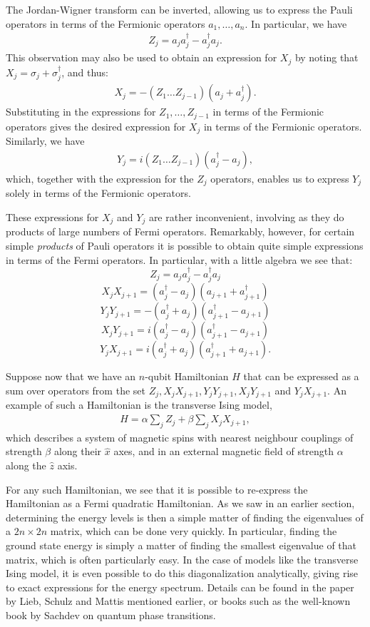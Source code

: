 \documentclass[12pt]{article}
\begin{document}
The Jordan-Wigner transform can be inverted, allowing us to express
the Pauli operators in terms of the Fermionic operators
$a_1,\ldots,a_n$.  In particular, we have
\begin{eqnarray}
  Z_j = a_ja_j^\dagger-a_j^\dagger a_j.
\end{eqnarray}
This observation may also be used to obtain an expression for $X_j$ by
noting that $X_j = \sigma_j +\sigma_j^\dagger$, and thus:
\begin{eqnarray}
  X_j = -(Z_1 \ldots Z_{j-1}) (a_j+a_j^\dagger).
\end{eqnarray}
Substituting in the expressions for $Z_1,\ldots,Z_{j-1}$ in terms of
the Fermionic operators gives the desired expression for $X_j$ in
terms of the Fermionic operators.  Similarly, we have
\begin{eqnarray}
  Y_j = i (Z_1 \ldots Z_{j-1}) (a_{j}^\dagger-a_{j}),
\end{eqnarray}
which, together with the expression for the $Z_j$ operators, enables
us to express $Y_j$ solely in terms of the Fermionic operators.

These expressions for $X_j$ and $Y_j$ are rather inconvenient,
involving as they do products of large numbers of Fermi operators.
Remarkably, however, for certain simple \emph{products} of Pauli
operators it is possible to obtain quite simple expressions in terms
of the Fermi operators.  In particular, with a little algebra we see
that:
$$
  Z_j = a_ja_j^\dagger - a_j^\dagger a_j
$$
$$
  X_jX_{j+1} = (a_j^\dagger-a_j)(a_{j+1}+a_{j+1}^\dagger )
$$
$$
  Y_jY_{j+1} = -(a_j^\dagger+a_j)(a_{j+1}^\dagger-a_{j+1})
$$
$$
  X_jY_{j+1} =  i(a_j^\dagger-a_j) (a_{j+1}^\dagger-a_{j+1})
$$
$$
  Y_jX_{j+1} = i(a_j^\dagger+a_j) (a_{j+1}^\dagger+a_{j+1}).
$$

Suppose now that we have an $n$-qubit Hamiltonian $H$ that can be
expressed as a sum over operators from the set $Z_j,
X_jX_{j+1},Y_jY_{j+1},X_jY_{j+1}$ and $Y_{j}X_{j+1}$.  An example of
such a Hamiltonian is the transverse Ising model,
\begin{eqnarray}
  H = \alpha \sum_j Z_j + \beta \sum_j X_j X_{j+1},
\end{eqnarray}
which describes a system of magnetic spins with nearest neighbour
couplings of strength $\beta$ along their $\hat x$ axes, and in an
external magnetic field of strength $\alpha$ along the $\hat z$ axis.

For any such Hamiltonian, we see that it is possible to re-express the
Hamiltonian as a Fermi quadratic Hamiltonian.  As we saw in an earlier
section, determining the energy levels is then a simple matter of
finding the eigenvalues of a $2n \times 2n$ matrix, which can be done
very quickly. In particular, finding the ground state energy is simply
a matter of finding the smallest eigenvalue of that matrix, which is
often particularly easy.  In the case of models like the transverse
Ising model, it is even possible to do this diagonalization
analytically, giving rise to exact expressions for the energy
spectrum.  Details can be found in the paper by Lieb, Schulz and
Mattis mentioned earlier, or books such as the well-known book by
Sachdev on quantum phase transitions.
\end{document}
